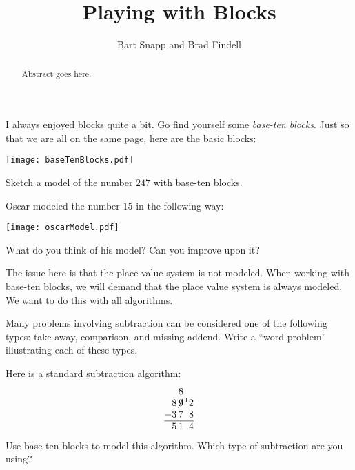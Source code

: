 \documentclass{ximera}
\title{Playing with Blocks}
\author{Bart Snapp and Brad Findell}
\begin{document}
\begin{abstract}
Abstract goes here.  
\end{abstract}
\maketitle

\label{A:B1}


I always enjoyed blocks quite a bit. Go find yourself
some \textit{base-ten blocks}. Just so that we are all on the same
page, here are the basic blocks:
\begin{image}
\texttt{[image: baseTenBlocks.pdf]}
\end{image}

\begin{problem} 
Sketch a model of the number $247$ with base-ten blocks.
\vspace{0.8in}
\end{problem}

\begin{problem}
Oscar modeled the number $15$ in the following way:
\begin{image}
\texttt{[image: oscarModel.pdf]}
\end{image}
What do you think of his model?  Can you improve upon it?  
\vspace{0.5in}
\end{problem}

\begin{teachingnote}
The issue here is that the place-value system is not modeled. When
working with base-ten blocks, we will demand that the place value
system is always modeled.  We want to do this with all algorithms.  
\end{teachingnote}

\begin{problem}
Many problems involving subtraction can be considered one of the following types:  take-away, comparison, and missing addend.  Write a ``word problem'' illustrating each of these types.  
\end{problem}

\begin{problem} 
Here is a standard subtraction algorithm:
\[
\begin{tabular}{@{}r@{}r@{}r@{}r@{}}
&   & 8 &  \\
& 8 & $\not{\hspace{-.2ex}9}$ & $\hspace{.3ex}\leftexp{1}2$\\
$-$ & 3 & 7 & 8\\ \hline
& 5 & 1 & 4
\end{tabular}
\]
Use base-ten blocks to model this algorithm.  Which type of subtraction are you using?  
\end{problem}
\end{document}
